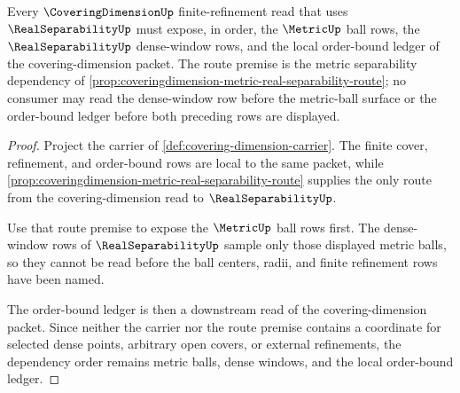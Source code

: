 \begin{theorem}
\label{thm:coveringdimension-metric-real-dependency}
Every $\CoveringDimensionUp$ finite-refinement read that uses $\RealSeparabilityUp$ must expose, in order, the $\MetricUp$ ball rows, the $\RealSeparabilityUp$ dense-window rows, and the local order-bound ledger of the covering-dimension packet. The route premise is the metric separability dependency of \autoref{prop:coveringdimension-metric-real-separability-route}; no consumer may read the dense-window row before the metric-ball surface or the order-bound ledger before both preceding rows are displayed.
\end{theorem}
\begin{proof}
Project the carrier of \autoref{def:covering-dimension-carrier}. The finite cover, refinement, and order-bound rows are local to the same packet, while \autoref{prop:coveringdimension-metric-real-separability-route} supplies the only route from the covering-dimension read to $\RealSeparabilityUp$.

Use that route premise to expose the $\MetricUp$ ball rows first. The dense-window rows of $\RealSeparabilityUp$ sample only those displayed metric balls, so they cannot be read before the ball centers, radii, and finite refinement rows have been named.

The order-bound ledger is then a downstream read of the covering-dimension packet. Since neither the carrier nor the route premise contains a coordinate for selected dense points, arbitrary open covers, or external refinements, the dependency order remains metric balls, dense windows, and the local order-bound ledger.
\end{proof}
